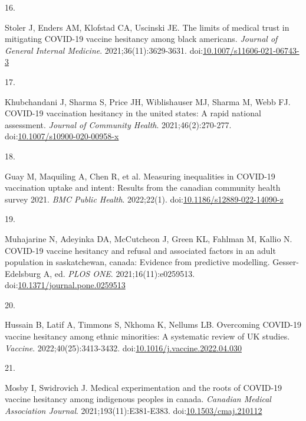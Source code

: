 \documentclass[
]{article}
\newlength{\cslhangindent}
\newlength{\csllabelwidth}
\newlength{\cslentryspacingunit} %
\newenvironment{CSLReferences}[2] %
 {%
  \setlength{\parindent}{0pt}
  \ifodd #1
  \let\oldpar\par
  \def\par{\hangindent=\cslhangindent\oldpar}
  \fi
  \setlength{\parskip}{#2\cslentryspacingunit}
 }%
 {}
\newcommand{\CSLLeftMargin}[1]{\parbox[t]{\csllabelwidth}{#1}}
\newcommand{\CSLRightInline}[1]{\parbox[t]{\linewidth - \csllabelwidth}{#1}\break}
\begin{document}
\begin{CSLReferences}{0}{0}
\leavevmode{}%
\CSLLeftMargin{16. }%
\CSLRightInline{Stoler J, Enders AM, Klofstad CA, Uscinski JE. The
limits of medical trust in mitigating {COVID}-19 vaccine hesitancy among
black americans. \emph{Journal of General Internal Medicine}.
2021;36(11):3629-3631.
doi:\href{https://doi.org/10.1007/s11606-021-06743-3}{10.1007/s11606-021-06743-3}}

\leavevmode{}%
\CSLLeftMargin{17. }%
\CSLRightInline{Khubchandani J, Sharma S, Price JH, Wiblishauser MJ,
Sharma M, Webb FJ. {COVID}-19 vaccination hesitancy in the united
states: A rapid national assessment. \emph{Journal of Community Health}.
2021;46(2):270-277.
doi:\href{https://doi.org/10.1007/s10900-020-00958-x}{10.1007/s10900-020-00958-x}}

\leavevmode{}%
\CSLLeftMargin{18. }%
\CSLRightInline{Guay M, Maquiling A, Chen R, et al. Measuring
inequalities in {COVID}-19 vaccination uptake and intent: Results from
the canadian community health survey 2021. \emph{{BMC} Public Health}.
2022;22(1).
doi:\href{https://doi.org/10.1186/s12889-022-14090-z}{10.1186/s12889-022-14090-z}}

\leavevmode{}%
\CSLLeftMargin{19. }%
\CSLRightInline{Muhajarine N, Adeyinka DA, McCutcheon J, Green KL,
Fahlman M, Kallio N. {COVID}-19 vaccine hesitancy and refusal and
associated factors in an adult population in saskatchewan, canada:
Evidence from predictive modelling. Gesser-Edelsburg A, ed. \emph{{PLOS}
{ONE}}. 2021;16(11):e0259513.
doi:\href{https://doi.org/10.1371/journal.pone.0259513}{10.1371/journal.pone.0259513}}

\leavevmode{}%
\CSLLeftMargin{20. }%
\CSLRightInline{Hussain B, Latif A, Timmons S, Nkhoma K, Nellums LB.
Overcoming {COVID}-19 vaccine hesitancy among ethnic minorities: A
systematic review of {UK} studies. \emph{Vaccine}.
2022;40(25):3413-3432.
doi:\href{https://doi.org/10.1016/j.vaccine.2022.04.030}{10.1016/j.vaccine.2022.04.030}}

\leavevmode{}%
\CSLLeftMargin{21. }%
\CSLRightInline{Mosby I, Swidrovich J. Medical experimentation and the
roots of {COVID}-19 vaccine hesitancy among indigenous peoples in
canada. \emph{Canadian Medical Association Journal}.
2021;193(11):E381-E383.
doi:\href{https://doi.org/10.1503/cmaj.210112}{10.1503/cmaj.210112}}


\end{CSLReferences}
\end{document}
